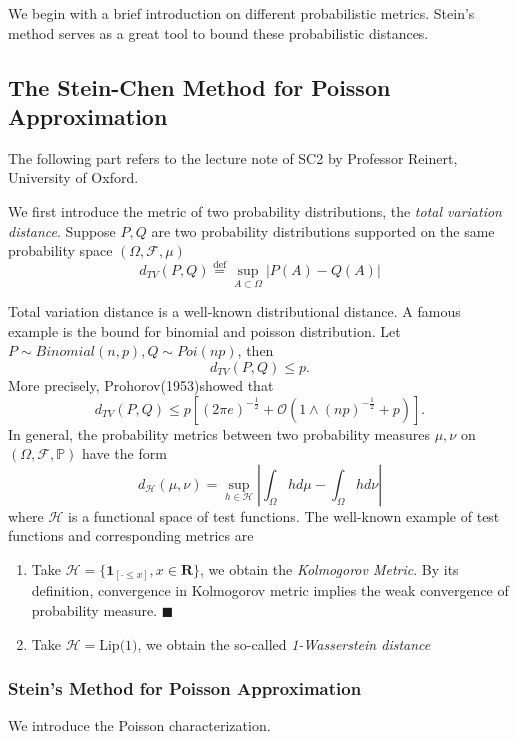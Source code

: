 \documentclass[11pt,english]{smfart}
\newcommand{\defeq}{\overset{\mathrm{def}}{=}}
\newcommand{\mb}{\mathbb}
\newcommand{\mc}{\mathcal}
\newcommand{\mf}{\mathbf}
\begin{document}
We begin with a brief introduction on different probabilistic metrics. Stein's method serves as a great tool to bound these probabilistic distances.

\subsection{The Stein-Chen Method for Poisson Approximation}
The following part refers to the lecture note of SC2 by Professor Reinert, University of Oxford.

We first introduce the metric of two probability distributions, the \textit{total variation distance}. Suppose $P,Q$ are two probability distributions supported on the same probability space $(\Omega,\mathcal{F},\mu)$
$$d_{TV}(P,Q) \defeq \sup_{A\subset \Omega} |P(A) - Q(A)| $$

Total variation distance is a well-known distributional distance. A famous example is the bound for binomial and poisson distribution. Let $P \sim Binomial(n,p), Q \sim Poi(np)$, then
$$d_{TV}(P,Q) \leq p.$$
More precisely, Prohorov(1953)showed that 
$$d_{TV}(P,Q) \leq p\left[(2\pi e)^{-\frac{1}{2}} + \mathcal{O}\left(1\wedge \left(np\right)^{-\frac{1}{2}} + p\right)\right].$$
In general, the probability metrics between two probability measures $\mu,\nu$ on $(\Omega,\mathcal{F},\mb{P})$ have the form 
$$d_{\mathcal{H}}(\mu,\nu) = \sup_{h\in \mathcal{H}}\left|\int_\Omega hd\mu - \int_\Omega hd\nu \right|$$
where $\mathcal{H}$ is a functional space of test functions. The well-known example of test functions and corresponding metrics are
\begin{enumerate}
    \item Take $\mathcal{H} = \{\mf{1}_{[\cdot \leq x]},x\in\mf{R}\}$, we obtain the \textit{Kolmogorov Metric}. By its definition, convergence in Kolmogorov metric implies the weak convergence of probability measure. $\blacksquare $
    \item Take $\mc{H} = \text{Lip(1)}$, we obtain the so-called \textit{1-Wasserstein distance}
\end{enumerate}

\subsubsection{Stein's Method for Poisson Approximation}
We introduce the Poisson characterization. \\
\end{document}
